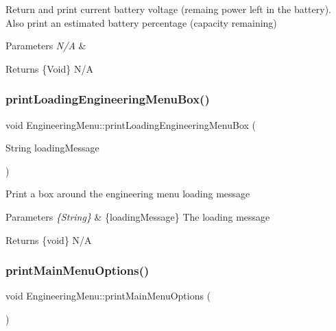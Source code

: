 Return and print current battery voltage (remaing power left in the battery). Also print an estimated battery percentage (capacity remaining) 
\begin{DoxyParams}{Parameters}
{\em N/A} & \\
\hline
\end{DoxyParams}
\begin{DoxyReturn}{Returns}
\{Void\} N/A 
\end{DoxyReturn}
\mbox{\label{class_engineering_menu_a414a551c8e696dc32b41899ee7367a24}} 
\subsubsection{\texorpdfstring{print\+Loading\+Engineering\+Menu\+Box()}{printLoadingEngineeringMenuBox()}}
{\footnotesize\ttfamily void Engineering\+Menu\+::print\+Loading\+Engineering\+Menu\+Box (\begin{DoxyParamCaption}\item[{String}]{loading\+Message }\end{DoxyParamCaption})}

Print a box around the engineering menu \textquotesingle{}loading\textquotesingle{} message 
\begin{DoxyParams}{Parameters}
{\em \{\+String\}} & \{loading\+Message\} The loading message \\
\hline
\end{DoxyParams}
\begin{DoxyReturn}{Returns}
\{void\} N/A 
\end{DoxyReturn}
\mbox{\label{class_engineering_menu_acdf6585caa040c7d5ad5277dc68e2639}} 
\subsubsection{\texorpdfstring{print\+Main\+Menu\+Options()}{printMainMenuOptions()}}
{\footnotesize\ttfamily void Engineering\+Menu\+::print\+Main\+Menu\+Options (\begin{DoxyParamCaption}{ }\end{DoxyParamCaption})}

